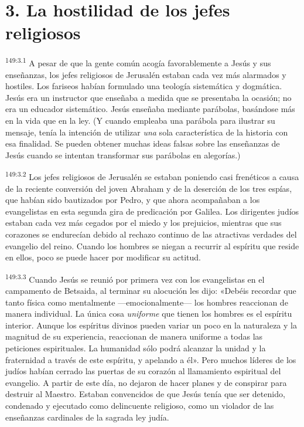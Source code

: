 \section*{3. La hostilidad de los jefes religiosos}
\par 
\textsuperscript{149:3.1} A pesar de que la gente común acogía favorablemente a Jesús y sus enseñanzas, los jefes religiosos de Jerusalén estaban cada vez más alarmados y hostiles. Los fariseos habían formulado una teología sistemática y dogmática. Jesús era un instructor que enseñaba a medida que se presentaba la ocasión; no era un educador sistemático. Jesús enseñaba mediante parábolas, basándose más en la vida que en la ley. (Y cuando empleaba una parábola para ilustrar su mensaje, tenía la intención de utilizar \textit{una} sola característica de la historia con esa finalidad. Se pueden obtener muchas ideas falsas sobre las enseñanzas de Jesús cuando se intentan transformar sus parábolas en alegorías.)

\par 
\textsuperscript{149:3.2} Los jefes religiosos de Jerusalén se estaban poniendo casi frenéticos a causa de la reciente conversión del joven Abraham y de la deserción de los tres espías, que habían sido bautizados por Pedro, y que ahora acompañaban a los evangelistas en esta segunda gira de predicación por Galilea. Los dirigentes judíos estaban cada vez más cegados por el miedo y los prejuicios, mientras que sus corazones se endurecían debido al rechazo continuo de las atractivas verdades del evangelio del reino. Cuando los hombres se niegan a recurrir al espíritu que reside en ellos, poco se puede hacer por modificar su actitud.

\par 
\textsuperscript{149:3.3} Cuando Jesús se reunió por primera vez con los evangelistas en el campamento de Betsaida, al terminar su alocución les dijo: «Debéis recordar que tanto física como mentalmente ---emocionalmente--- los hombres reaccionan de manera individual. La única cosa \textit{uniforme} que tienen los hombres es el espíritu interior. Aunque los espíritus divinos pueden variar un poco en la naturaleza y la magnitud de su experiencia, reaccionan de manera uniforme a todas las peticiones espirituales. La humanidad sólo podrá alcanzar la unidad y la fraternidad a través de este espíritu, y apelando a él». Pero muchos líderes de los judíos habían cerrado las puertas de su corazón al llamamiento espiritual del evangelio. A partir de este día, no dejaron de hacer planes y de conspirar para destruir al Maestro. Estaban convencidos de que Jesús tenía que ser detenido, condenado y ejecutado como delincuente religioso, como un violador de las enseñanzas cardinales de la sagrada ley judía.

